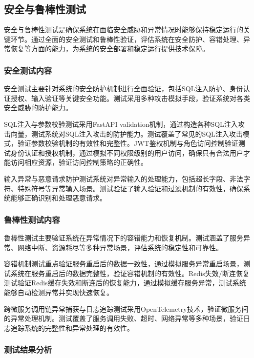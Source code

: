 \subsection{安全与鲁棒性测试}

安全与鲁棒性测试是确保系统在面临安全威胁和异常情况时能够保持稳定运行的关键环节。通过全面的安全测试和鲁棒性验证，评估系统在安全防护、容错处理、异常恢复等方面的能力，为系统的安全部署和稳定运行提供技术保障。

\subsubsection{安全测试内容}

安全测试主要针对系统的安全防护机制进行全面验证，包括SQL注入防护、身份认证授权、输入验证等关键安全功能。测试采用多种攻击模拟手段，验证系统对各类安全威胁的防护能力。

SQL注入与参数校验测试采用FastAPI validation机制，通过构造各种SQL注入攻击向量，测试系统对SQL注入攻击的防护能力。测试覆盖了常见的SQL注入攻击模式，验证参数校验机制的有效性和完整性。JWT鉴权机制与角色访问控制验证测试身份认证和授权机制，通过模拟不同权限级别的用户访问，确保只有合法用户才能访问相应资源，验证访问控制策略的正确性。

输入异常与恶意请求防护测试系统对异常输入的处理能力，包括超长字段、非法字符、特殊符号等异常输入场景。测试验证了输入验证和过滤机制的有效性，确保系统能够正确识别和处理恶意请求。

\subsubsection{鲁棒性测试内容}

鲁棒性测试主要验证系统在异常情况下的容错能力和恢复机制。测试涵盖了服务异常、网络中断、资源耗尽等多种异常场景，评估系统的稳定性和可靠性。

容错机制测试重点验证服务重启后的数据一致性，通过模拟服务异常重启场景，测试系统在服务重启后的数据完整性，验证容错机制的有效性。Redis失效/断连恢复测试验证Redis缓存失效和断连后的恢复能力，通过模拟缓存服务异常，测试系统能够自动检测异常并实现快速恢复。

跨微服务调用链异常捕获与日志追踪测试采用OpenTelemetry技术，验证微服务间的异常处理机制。测试覆盖了服务调用失败、超时、网络异常等多种场景，验证日志追踪系统的完整性和异常处理的有效性。

\subsubsection{测试结果分析}

